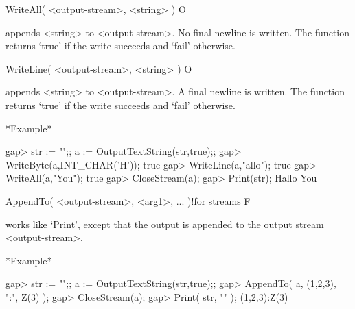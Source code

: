 \>WriteAll( <output-stream>, <string> ) O

appends  <string> to <output-stream>.   No final  newline is written.
The function returns `true' if the write succeeds and `fail' otherwise.

\>WriteLine( <output-stream>, <string> ) O

appends  <string> to <output-stream>.   A  final newline is written.
The function returns `true' if the write succeeds and `fail' otherwise.

*Example*

\beginexample
gap> str := "";; a := OutputTextString(str,true);;
gap> WriteByte(a,INT_CHAR('H'));
true
gap> WriteLine(a,"allo");
true
gap> WriteAll(a,"You\n");
true
gap> CloseStream(a);
gap> Print(str);
Hallo
You
\endexample

\>AppendTo( <output-stream>, <arg1>, ... )!{for streams} F

works like  `Print',  except that the  output is  appended to the  output
stream <output-stream>.

*Example*

\beginexample
gap> str := "";; a := OutputTextString(str,true);;
gap> AppendTo( a, (1,2,3), ":", Z(3) );
gap> CloseStream(a);
gap> Print( str, "\n" );
(1,2,3):Z(3)
\endexample


